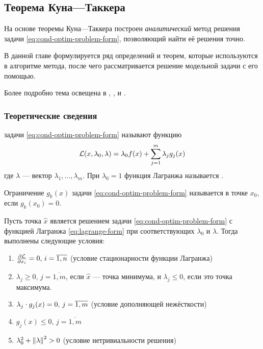 \subsection{Теорема Куна—Таккера}
\label{sec:kuhn-tucker}

На основе теоремы Куна—Таккера построен \emph{аналитический} метод
решения задачи \eqref{eq:cond-optim-problem-form}, позволяющий найти
её решения точно. 

В данной главе формулируется ряд определений и теорем, которые
используются в алгоритме метода, после чего рассматривается решение
модельной задачи с его помощью.

Более подробно тема освещена в \cite{alekseev05}, \cite{izmailov05},
\cite{taha05} и \cite{polovinkin04}.

\subsubsection{Теоретические сведения}

\begin{dfn}  задачи
  \eqref{eq:cond-optim-problem-form} называют функцию
  \begin{equation}
    \label{eq:lagrange-form}
    \mathcal{L}(x, \lambda_0, \lambda) = \lambda_0 f(x) + \sum_{j=1}^m {\lambda_j g_j(x)}
  \end{equation}
  где $\lambda$ — вектор $\lambda_1, \dotsc, \lambda_m$. При
  $\lambda_0=1$ функция Лагранжа называется .
\end{dfn}

\begin{dfn}
  \label{dfn:active-constraint}
  Ограничение $g_k(x)$ задачи \eqref{eq:cond-optim-problem-form}
  называется  в точке $x_0$, если $g_k(x_0)=0$.
\end{dfn}

\begin{thm}
  \label{th:kuhn-tucker}
  Пусть точка $\hat{x}$ является решением задачи
  \eqref{eq:cond-optim-problem-form} с функцией Лагранжа
  \eqref{eq:lagrange-form} при соответствующих $\lambda_0$ и
  $\lambda$. Тогда выполнены следующие условия:
  \begin{enumerate}
    \renewcommand{\labelenumi}{\emph{\asbuk{enumi})}}
  \item $\frac{\partial{\mathcal{L}}}{\partial{x_i}}=0,\, i=\overline{1,n}$ (условие
    стационарности функции Лагранжа)
  \item $\lambda_j \geq 0,\, j=\overline{1,m}$, если $\hat{x}$ — точка
    минимума, и $\lambda_j \leq 0$, если это точка максимума.
  \item $\lambda_j \cdot g_j(x) = 0,\, j=\overline{1,m}$ (условие
    дополняющей нежёсткости)
  \item $g_j(x) \leq 0,\, j=\overline{1,m}$
  \item $\lambda_0^2 + \left \lVert{\lambda}\right \rVert^2 > 0$ (условие нетривиальности решения)
  \end{enumerate}
\end{thm}

